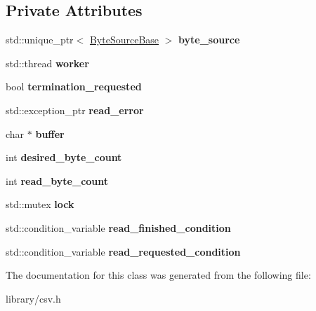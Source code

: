 \subsection*{Private Attributes}
\begin{DoxyCompactItemize}
\item 
\mbox{\label{classio_1_1detail_1_1AsynchronousReader_a6fd9551f8df07ec6a9ce32f8f33b362d}} 
std\+::unique\+\_\+ptr$<$ \hyperlink{classio_1_1ByteSourceBase}{Byte\+Source\+Base} $>$ {\bfseries byte\+\_\+source}
\item 
\mbox{\label{classio_1_1detail_1_1AsynchronousReader_a729cf01cc703a42b6010dd5bec4a14f2}} 
std\+::thread {\bfseries worker}
\item 
\mbox{\label{classio_1_1detail_1_1AsynchronousReader_a63031e519f616e839031529872bfa164}} 
bool {\bfseries termination\+\_\+requested}
\item 
\mbox{\label{classio_1_1detail_1_1AsynchronousReader_a6cb2b4a80454dc3b459a378693423a78}} 
std\+::exception\+\_\+ptr {\bfseries read\+\_\+error}
\item 
\mbox{\label{classio_1_1detail_1_1AsynchronousReader_a1b755d751a33453ddaff7974bed29434}} 
char $\ast$ {\bfseries buffer}
\item 
\mbox{\label{classio_1_1detail_1_1AsynchronousReader_a9bde5d9c5268af659cbb623bea6715fe}} 
int {\bfseries desired\+\_\+byte\+\_\+count}
\item 
\mbox{\label{classio_1_1detail_1_1AsynchronousReader_ab7aa18093deb7ae67f1c0a699dd4ef93}} 
int {\bfseries read\+\_\+byte\+\_\+count}
\item 
\mbox{\label{classio_1_1detail_1_1AsynchronousReader_a4fdba0a72e02dd5168b540795acac35e}} 
std\+::mutex {\bfseries lock}
\item 
\mbox{\label{classio_1_1detail_1_1AsynchronousReader_a1ad4bce56a87bb95bae7a21f927c8db0}} 
std\+::condition\+\_\+variable {\bfseries read\+\_\+finished\+\_\+condition}
\item 
\mbox{\label{classio_1_1detail_1_1AsynchronousReader_aaa5c6c774868149377cde2f8857d223d}} 
std\+::condition\+\_\+variable {\bfseries read\+\_\+requested\+\_\+condition}
\end{DoxyCompactItemize}


The documentation for this class was generated from the following file\+:\begin{DoxyCompactItemize}
\item 
library/csv.\+h\end{DoxyCompactItemize}
